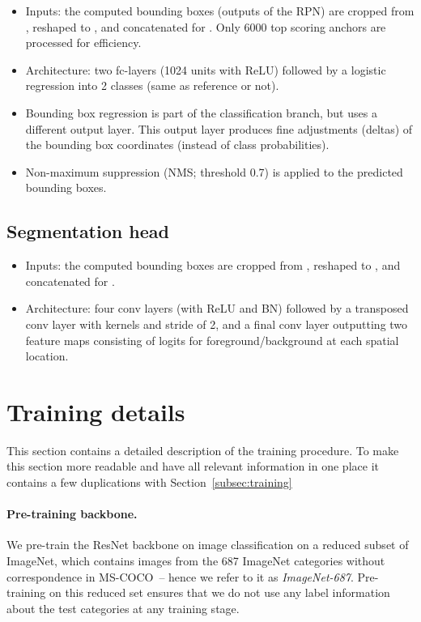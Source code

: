 \documentclass{article}
\newcommand{\coco}{MS-COCO\xspace}
\begin{document}
\begin{itemize}[nosep]
    \item Inputs: the computed bounding boxes (outputs of the RPN) are cropped from  , reshaped to , and concatenated for . Only 6000 top scoring anchors are processed for efficiency.
    \item Architecture: two fc-layers (1024 units with ReLU) followed by a logistic regression into 2 classes (same as reference or not).
    \item Bounding box regression is part of the classification branch, but uses a different output layer. This output layer produces fine adjustments (deltas) of the bounding box coordinates (instead of class probabilities).
    \item Non-maximum suppression (NMS; threshold 0.7) is applied to the predicted bounding boxes.
\end{itemize}

\subsection{Segmentation head}
\begin{itemize}[nosep]
    \item Inputs: the computed bounding boxes are cropped from  , reshaped to , and concatenated for .
    \item Architecture: four  conv layers (with ReLU and BN) followed by a transposed conv layer with  kernels and stride of 2, and a final  conv layer outputting two feature maps consisting of logits for foreground/background at each spatial location.
\end{itemize}

\section{Training details}
\label{appendix:training}

This section contains a detailed description of the training procedure. To make this section more readable and have all relevant information in one place it contains a few duplications with Section~\ref{subsec:training}

\paragraph{Pre-training backbone.}
We pre-train the ResNet backbone on image classification on a reduced subset of ImageNet, which contains images from the 687 ImageNet categories without correspondence in \coco~-- hence we refer to it as \emph{ImageNet-687}. Pre-training on this reduced set ensures that we do not use any label information about the test categories at any training stage.
\end{document}
